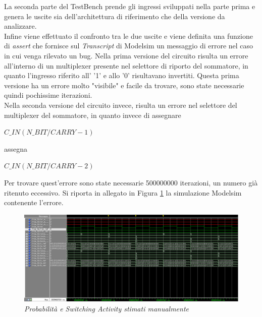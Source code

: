 La seconda parte del TestBench prende gli ingressi sviluppati nella parte prima e genera le uscite sia dell'architettura di riferimento che della versione da analizzare.\\
Infine viene effettuato il confronto tra le due uscite e viene definita una funzione di \textit{assert} che fornisce sul \textit{Transcript} di Modelsim un messaggio di errore nel caso in cui venga rilevato un bug.
Nella prima versione del circuito risulta un errore all'interno di un multiplexer presente nel selettore di riporto del sommatore, in quanto l'ingresso riferito all' '1' e allo '0' risultavano invertiti. Questa prima versione ha un errore molto "visibile" e facile da trovare, sono state necessarie quindi pochissime iterazioni.\\
Nella seconda versione del circuito invece, risulta un errore nel selettore del multiplexer del sommatore, in quanto invece di assegnare
\begin{center}
	$C\_IN(N\_BIT/CARRY-1)$
\end{center} 
assegna 
\begin{center}
	$C\_IN(N\_BIT/CARRY-2)$
\end{center}
Per trovare quest'errore sono state necessarie 500000000 iterazioni, un numero già ritenuto eccessivo. Si riporta in allegato in Figura \ref{sim1} la simulazione Modelsim contenente l'errore.
\begin{figure}[!htb]
	\centering
	\includegraphics[scale=0.6]{immagini/sim1}
	\caption{\textit{Probabilità e Switching Activity stimati manualmente}}
	\label{sim1}
\end{figure}
